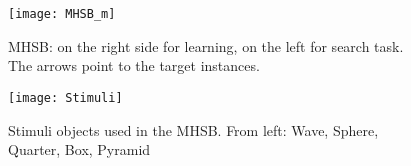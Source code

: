 \begin{figure}[H]
	\centering
	\begin{minipage}{0.49\textwidth}
		\centering
		\texttt{[image: MHSB\_m]}
		\captionsetup{width=0.9\textwidth}
		\caption{MHSB: on the right side for learning, on the left for search task. The arrows point to the target instances.}
		\label{MHSBBOARDS}
	\end{minipage}
	\begin{minipage}{0.49\textwidth}
		\centering
		\texttt{[image: Stimuli]}
		\captionsetup{width=0.9\textwidth}
		\caption{Stimuli objects used in the MHSB. From left: Wave, Sphere, Quarter, Box, Pyramid}
		\label{Stimuli}
	\end{minipage}
\end{figure}


